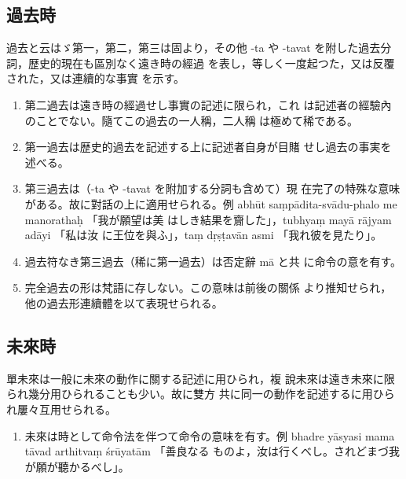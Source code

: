 \subsection{過去時}
\numberParagraph
過去と云はゞ第一，第二，第三は固より，その他 -ta や
-tavat を附した過去分詞，歴史的現在も區別なく遠き時の經過
を表し，等しく一度起つた，又は反覆された，又は連續的な事實
を示す。
\begin{enumerate}[label=(\alph*)]
\item 第二過去は遠き時の經過せし事實の記述に限られ，これ
は記述者の經驗內のことでない。隨てこの過去の一人稱，二人稱
は極めて稀である。
\item 第一過去は歴史的過去を記述する上に記述者自身が目賭
せし過去の事実を述べる。
\item 第三過去は（-ta や -tavat を附加する分詞も含めて）現
在完了の特殊な意味がある。故に對話の上に適用せられる。例
abhūt saṃpādita-svādu-phalo me manorathaḥ 「我が願望は美
はしき結果を齎した」，tubhyaṃ mayā rājyam adāyi 「私は汝
に王位を與ふ」，taṃ dṛṣṭavān asmi 「我れ彼を見たり」。
\item 過去符なき第三過去（稀に第一過去）は否定辭 mā と共
に命令の意を有す。
\item 完全過去の形は梵語に存しない。この意味は前後の關係
より推知せられ，他の過去形連續體を以て表現せられる。
\end{enumerate}

\subsection{未來時}
\numberParagraph
單未來は一般に未來の動作に關する記述に用ひられ，複
說未來は遠き未來に限られ幾分用ひられることも少い。故に雙方
共に同一の動作を記述するに用ひられ屢々互用せられる。
\begin{enumerate}[label=(\alph*)]
\item 未來は時として命令法を伴つて命令の意味を有す。例
bhadre yāsyasi mama tāvad arthitvaṃ śrūyatām 「善良なる
ものよ，汝は行くべし。されどまづ我が願が聽かるべし」。
\end{enumerate}

